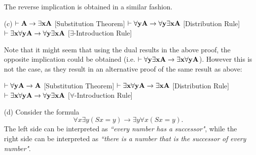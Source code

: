 The reverse implication is obtained in a similar fashion.

\ansitem (c)
\itemitem{} $\vdash {\bf A} \to \exists{\bf x}{\bf A}$ \hfill [Substitution Theorem]
\itemitem{} $\vdash \forall{\bf y}{\bf A} \to \forall{\bf y}\exists{\bf x}{\bf A}$ \hfill [Distribution Rule]
\itemitem{} $\vdash \exists{\bf x}\forall{\bf y}{\bf A} \to \forall{\bf y}\exists{\bf x}{\bf A}$ \hfill [$\exists$-Introduction Rule]

Note that it might seem that using the dual results in the above proof, the opposite implication could be
obtained (i.e. $\vdash \forall{\bf y}\exists{\bf x}{\bf A} \to \exists{\bf x}\forall{\bf y}{\bf A}$). However this is not the case, as
they result in an alternative proof of the same result as above:

\itemitem{} $\vdash \forall{\bf y}{\bf A} \to {\bf A}$ \hfill [Substitution Theorem]
\itemitem{} $\vdash \exists{\bf x}\forall{\bf y}{\bf A} \to \exists{\bf x}{\bf A}$ \hfill [Distribution Rule]
\itemitem{} $\vdash \exists{\bf x}\forall{\bf y}{\bf A} \to \forall{\bf y}\exists{\bf x}{\bf A}$ \hfill [$\forall$-Introduction Rule]

\ansitem (d) Consider the formula
$$\forall x \exists y (Sx = y) \to \exists y \forall x (Sx = y).$$
The left side can be interpreted as {\it ``every number has a successor"}, while the
right side can be interpreted as {\it ``there is a number that is the successor of every number"}.


\vfill
\break
